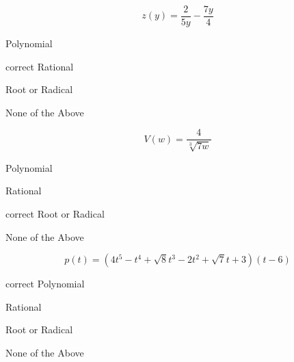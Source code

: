 \documentclass{ximera}
\begin{document}
\begin{exercise}
\begin{question}
\end{question}











\begin{question}


\[
z(y) = \frac{2}{5y}  - \frac{7y}{4}
\]

\begin{multipleChoice}
\item {Polynomial}
\item [correct]{Rational}
\item {Root or Radical}
\item {None of the Above}
\end{multipleChoice}


\end{question}










\begin{question}


\[
V(w) = \frac{4}{\sqrt[3]{7w}}
\]

\begin{multipleChoice}
\item {Polynomial}
\item {Rational}
\item [correct]{Root or Radical}
\item {None of the Above}
\end{multipleChoice}


\end{question}













\begin{question}


\[
p(t) = (4t^5 - t^4 + \sqrt{8} t^3 - 2t^2 + \sqrt{7} t + 3)(t-6)
\]

\begin{multipleChoice}
\item [correct]{Polynomial}
\item {Rational}
\item {Root or Radical}
\item {None of the Above}
\end{multipleChoice}



\end{question}
\end{exercise}
\end{document}
